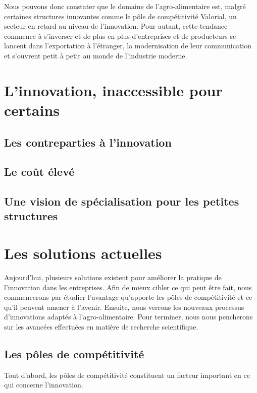 \documentclass[a4paper,10pt]{report}
\begin{document}
			Nous pouvons donc constater que le domaine de l’agro-alimentaire est, malgré certaines structures innovantes comme le pôle de compétitivité Valorial, un secteur en retard au niveau de l’innovation. Pour autant, cette tendance commence à s’inverser et de plus en plus d’entreprises et de producteurs se lancent dans l’exportation à l’étranger, la modernisation de leur communication et s’ouvrent petit à petit au monde de l’industrie moderne.
			
	\section{L'innovation, inaccessible pour certains}
		
		\subsection{Les contreparties à l'innovation}
			
		\subsection{Le coût élevé}
				
		\subsection{Une vision de spécialisation pour les petites structures}
			
	\section{Les solutions actuelles}
		Aujourd’hui, plusieurs solutions existent pour améliorer la pratique de l’innovation dans les entreprises. Afin de mieux cibler ce qui peut être fait, nous commencerons par étudier l’avantage qu’apporte les pôles de compétitivité et ce qu’il peuvent amener à l’avenir. Ensuite, nous verrons les nouveaux processus d’innovations adaptés à l’agro-alimentaire. Pour terminer, nous nous pencherons sur les avancées effectuées en matière de recherche scientifique.
		
		\subsection{Les pôles de compétitivité}
		Tout d’abord, les pôles de compétitivité constituent un facteur important en ce qui concerne l’innovation.
		
\end{document}
